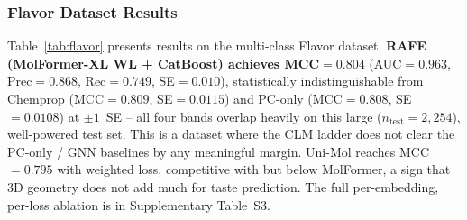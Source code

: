 \documentclass[pdflatex,sn-mathphys-num]{sn-jnl}%
\begin{document}
\subsubsection{Flavor Dataset Results}
Table~\ref{tab:flavor} presents results on the multi-class Flavor dataset. \textbf{RAFE (MolFormer-XL WL + CatBoost) achieves MCC$=0.804$} (AUC$=0.963$, Prec$=0.868$, Rec$=0.749$, SE$=0.010$), statistically indistinguishable from Chemprop (MCC$=0.809$, SE$=0.0115$) and PC-only (MCC$=0.808$, SE$=0.0108$) at $\pm1$~SE -- all four bands overlap heavily on this large ($n_\text{test}=2{,}254$), well-powered test set. This is a dataset where the CLM ladder does not clear the PC-only / GNN baselines by any meaningful margin. Uni-Mol reaches MCC$=0.795$ with weighted loss, competitive with but below MolFormer, a sign that 3D geometry does not add much for taste prediction. The full per-embedding, per-loss ablation is in Supplementary Table~S3.

\begin{table}[t]
\centering
\caption{Best performing configurations on Flavor. Prec/Rec are macro-averaged; AUC is one-vs-rest macro ROC AUC.}
\label{tab:flavor}
\end{table}
\end{document}
